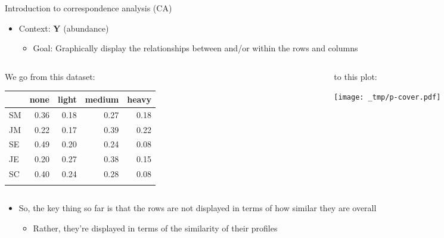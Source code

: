 \documentclass[
  ignorenonframetext,
  aspectratio=169]{beamer}
\providecommand{\tightlist}{%
  \setlength{\itemsep}{0pt}\setlength{\parskip}{0pt}}\usepackage{longtable,booktabs,array}
\begin{document}
\begin{frame}{Introduction to correspondence analysis (CA)}
\protect\hypertarget{introduction-to-correspondence-analysis-ca-1}{}
\vspace{0.5cm}

\begin{itemize}
\tightlist
\item
  Context: \(\symbf{Y}\) (abundance)

  \begin{itemize}
  \tightlist
  \item
    Goal: Graphically display the relationships between and/or within
    the rows and columns
  \end{itemize}
\end{itemize}

\begin{columns}[T]
\begin{column}{0.45\textwidth}
\begin{center} 

We go from this dataset:

\end{center}

\vspace{0.4cm}

\begin{longtable}[]{@{}lrrrr@{}}
\toprule\noalign{}
& none & light & medium & heavy \\
\midrule\noalign{}
\endhead
SM & 0.36 & 0.18 & 0.27 & 0.18 \\
JM & 0.22 & 0.17 & 0.39 & 0.22 \\
SE & 0.49 & 0.20 & 0.24 & 0.08 \\
JE & 0.20 & 0.27 & 0.38 & 0.15 \\
SC & 0.40 & 0.24 & 0.28 & 0.08 \\
\bottomrule\noalign{}
\end{longtable}
\end{column}

\begin{column}{0.025\textwidth}
\end{column}

\begin{column}{0.525\textwidth}
\begin{center}
to this plot:
\end{center}

\vspace{-1cm}

\texttt{[image: \_tmp/p-cover.pdf]}
\end{column}
\end{columns}

\begin{itemize}
\tightlist
\item
  So, the key thing so far is that the rows are not displayed in terms
  of how similar they are overall

  \begin{itemize}
  \tightlist
  \item
    Rather, they're displayed in terms of the similarity of their
    profiles
  \end{itemize}
\end{itemize}
\end{frame}
\end{document}
